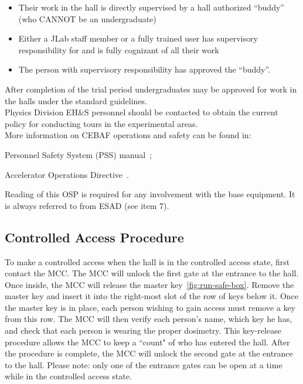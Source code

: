 \begin{itemize}
\item Their work in the hall is directly supervised by a hall
 authorized ``buddy'' (who CANNOT be an undergraduate)
\item Either a JLab staff member or a fully trained user has
 supervisory responsibility for and is fully cognizant of all their
 work
\item The person with supervisory responsibility has approved the
``buddy''.
\end{itemize}

\noindent{}After completion of the trial period undergraduates may be
approved for work in the halls under the standard guidelines. \\ 

\noindent{}Physics Division EH\&S personnel should be contacted to obtain
the current policy for conducting tours in the experimental areas.\\ 

\noindent{} More information on CEBAF operations and safety can be found in:
 \begin{list}{--}{\setlength{\itemsep}{-0.2cm}}
    \item Personnel Safety System (PSS) manual~\cite{PSScebaf};
    \item Accelerator Operations Directive~\cite{AODcebaf}.
 \end{list}


 \noindent{}Reading of this OSP is required for any involvement
 with the base equipment. 
 It is always referred to from ESAD (see item 7).


\begin{safetyen}{10}{10}
\subsection{Controlled Access Procedure} 
\end{safetyen}

To make a controlled access when the hall is in the controlled access
state, first contact the MCC. The MCC will unlock the first gate at
the entrance to the hall. Once inside, the MCC will release the master
key~\ref{fig:run-safe-box}. 
Remove the master key and insert it into the right-most slot of
the row of keys below it. Once the master key is in place, each person
wishing to gain access must remove a key from this row. The MCC will
then verify each person's name, which key he has, and check that each
person is wearing the proper dosimetry. This key-release procedure
allows the MCC to keep a ``count" of who has entered the hall. After
the procedure is complete, the MCC will unlock the second gate at the
entrance to the hall. Please note: only one of the entrance gates can
be open at a time while in the controlled access state.
 
